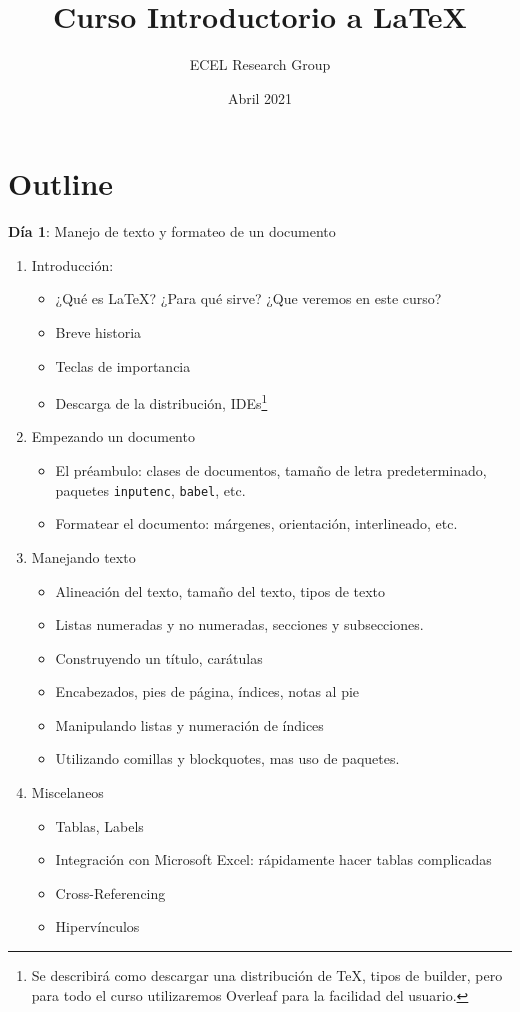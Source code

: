 \documentclass[a4paper]{article}
\title{Curso Introductorio a \LaTeX}
\author{ECEL Research Group}
\date{Abril 2021}
\begin{document}
\maketitle
\section*{Outline}
\textbf{Día 1}: Manejo de texto y formateo de un documento
\begin{enumerate}
    \item Introducción: 
    \begin{itemize}
       \item ¿Qué es \LaTeX? ¿Para qué sirve? ¿Que veremos en este curso?
    \item Breve historia
     \item Teclas de importancia
     \item Descarga de la distribución, IDEs\footnote{Se describirá como descargar una distribución de \TeX, tipos de builder, pero para todo el curso utilizaremos Overleaf para la facilidad del usuario.}
    \end{itemize}
    \item Empezando un documento
    \begin{itemize}
            \item El préambulo: clases de documentos, tamaño de letra predeterminado, paquetes \texttt{inputenc}, \texttt{babel}, etc. 
        \item Formatear el documento: márgenes, orientación, interlineado, etc.
        
            \end{itemize}
    \item Manejando texto
    \begin{itemize}
        \item Alineación del texto,  tamaño del texto, tipos de texto
        \item Listas numeradas y no numeradas, secciones y subsecciones. 
        \item Construyendo un título, carátulas
        \item  Encabezados, pies de página, índices, notas al pie
        \item Manipulando listas y numeración de índices
        \item Utilizando comillas y blockquotes, mas uso de paquetes. 
        \end{itemize}
 \item Miscelaneos 
 \begin{itemize}
              \item Tablas, Labels
              \item Integración con Microsoft Excel: rápidamente hacer tablas complicadas
                \item Cross-Referencing
                \item Hipervínculos
 \end{itemize}

\end{enumerate}
\end{document}
